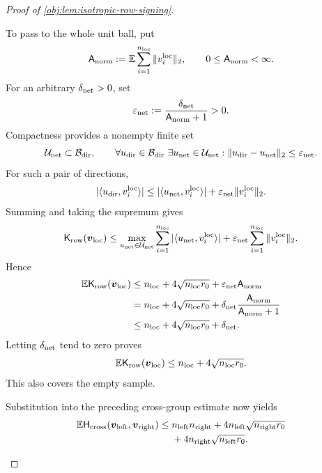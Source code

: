 \begin{proof}[Proof of \cref{obj:lem:isotropic-row-signing}]
\begin{enumerate}
To pass to the whole unit ball, put
\[
\mathsf A_{\rm norm}
:=\mathbb E\sum_{i=1}^{n_{\rm loc}}\|v_i^{\rm loc}\|_2,
\qquad
0\leq\mathsf A_{\rm norm}<\infty.
\]
For an arbitrary \(\delta_{\rm net}>0\), set
\[
\varepsilon_{\rm net}
:=\frac{\delta_{\rm net}}{\mathsf A_{\rm norm}+1}>0.
\]
Compactness provides a nonempty finite set
\[
\mathcal U_{\rm net}\subset\mathcal B_{\rm dir},
\qquad
\forall u_{\rm dir}\in\mathcal B_{\rm dir}\ 
\exists u_{\rm net}\in\mathcal U_{\rm net}:
\|u_{\rm dir}-u_{\rm net}\|_2\leq\varepsilon_{\rm net}.
\]
For such a pair of directions,
\[
|\langle u_{\rm dir},v_i^{\rm loc}\rangle|
\leq
|\langle u_{\rm net},v_i^{\rm loc}\rangle|
+\varepsilon_{\rm net}\|v_i^{\rm loc}\|_2.
\]
Summing and taking the supremum gives
\[
\mathsf K_{\rm row}(\boldsymbol v_{\rm loc})
\leq
\max_{u_{\rm net}\in\mathcal U_{\rm net}}
\sum_{i=1}^{n_{\rm loc}}|\langle u_{\rm net},v_i^{\rm loc}\rangle|
+\varepsilon_{\rm net}\sum_{i=1}^{n_{\rm loc}}\|v_i^{\rm loc}\|_2.
\]
Hence
\[
\begin{aligned}
\mathbb E\mathsf K_{\rm row}(\boldsymbol v_{\rm loc})
&\leq n_{\rm loc}+4\sqrt{n_{\rm loc}r_0}
+\varepsilon_{\rm net}\mathsf A_{\rm norm}\\
&=n_{\rm loc}+4\sqrt{n_{\rm loc}r_0}
+\delta_{\rm net}\frac{\mathsf A_{\rm norm}}{\mathsf A_{\rm norm}+1}\\
&\leq n_{\rm loc}+4\sqrt{n_{\rm loc}r_0}+\delta_{\rm net}.
\end{aligned}
\]
Letting \(\delta_{\rm net}\) tend to zero proves
\[
\mathbb E\mathsf K_{\rm row}(\boldsymbol v_{\rm loc})
\leq n_{\rm loc}+4\sqrt{n_{\rm loc}r_0}.
\]
This also covers the empty sample.

Substitution into the preceding cross-group estimate now yields
\[
\begin{aligned}
\mathbb E\mathsf H_{\rm cross}(\boldsymbol v_{\rm left},\boldsymbol v_{\rm right})
\leq{}&
n_{\rm left}n_{\rm right}
+4n_{\rm left}\sqrt{n_{\rm right}r_0}\\
&+4n_{\rm right}\sqrt{n_{\rm left}r_0}.
\end{aligned}
\]


\end{enumerate}
\end{proof}
